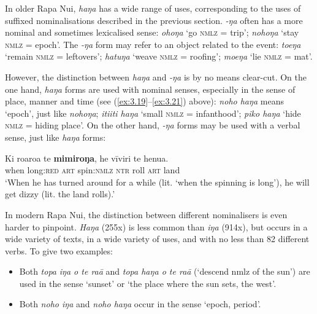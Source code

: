 In older Rapa Nui, \textit{haŋa} has a wide range of uses, corresponding to the uses of suffixed nominalisations described in the previous section. \textit{-ŋa} often has a more nominal and sometimes lexicalised sense: \textit{ohoŋa} ‘go \textsc{nmlz} = trip’; \textit{nohoŋa} ‘stay \textsc{nmlz} = epoch’. The \textit{-ŋa} form may refer to an object related to the event: \textit{toeŋa} ‘remain \textsc{nmlz} = leftovers’; \textit{hatuŋa} ‘weave \textsc{nmlz} = roofing’; \textit{moeŋa} ‘lie \textsc{nmlz} = mat’. 

However, the distinction between \textit{haŋa} and \textit{-ŋa} is by no means clear-cut. On the one hand, \textit{haŋa} forms are used with nominal senses, especially in the sense of place, manner and time (see (\ref{ex:3.19}–\ref{ex:3.21}) above): \textit{noho haŋa} means ‘epoch’, just like \textit{nohoŋa}; \textit{{\ꞌ}iti{\ꞌ}iti haŋa} ‘small \textsc{nmlz} = infanthood’; \textit{piko haŋa} ‘hide \textsc{nmlz} = hiding place’. On the other hand, \textit{-ŋa} forms may be used with a verbal sense, just like \textit{haŋa} forms:

\ea\label{ex:3.51}
\gll Ki roaroa te \textbf{mimiroŋa}, he vīviri te henua.\\
when long:\textsc{red} \textsc{art} spin:\textsc{nmlz} \textsc{ntr} roll \textsc{art} land\\

\glt 
‘When he has turned around for a while (lit. ‘when the spinning is long’), he will get dizzy (lit. the land rolls).’ \textstyleExampleref{[Ley-8-52.013]}
\z

In modern Rapa Nui, the distinction between different nominalisers is even harder to pinpoint. \textit{Haŋa} (255x) is less common than \textit{iŋa} (914x), but occurs in a wide variety of texts, in a wide variety of uses, and with no less than 82 different verbs. To give two examples: 

\begin{itemize}
\item 
Both \textit{topa} \textit{iŋa o te ra{\ꞌ}ā} and \textit{topa haŋa o te ra{\ꞌ}ā} (‘descend nmlz of the sun’) are used in the sense ‘sunset’ or ‘the place where the sun sets, the west’. 

\item 
Both \textit{noho iŋa} and \textit{noho haŋa} occur in the sense ‘epoch, period’. 

\end{itemize}

